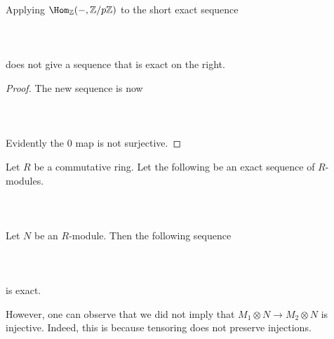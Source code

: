 \documentclass[a4paper]{article}
\begin{document}
\begin{eg}{}{} Applying $\Hom_\Z(-,\Z/p\Z)$ to the short exact sequence \\~\\
\\~\\
does not give a sequence that is exact on the right. 
\begin{proof}
The new sequence is now \\~\\
\\~\\
Evidently the $0$ map is not surjective. 
\end{proof}
\end{eg}

\begin{prp}{}{} Let $R$ be a commutative ring. Let the following be an exact sequence of $R$-modules. \\~\\
\\~\\ Let $N$ be an $R$-module. Then the following sequence \\~\\
 \\~\\
is exact. 
\end{prp}

However, one can observe that we did not imply that $M_1\otimes N\to M_2\otimes N$ is injective. Indeed, this is because tensoring does not preserve injections. 
\end{document}
